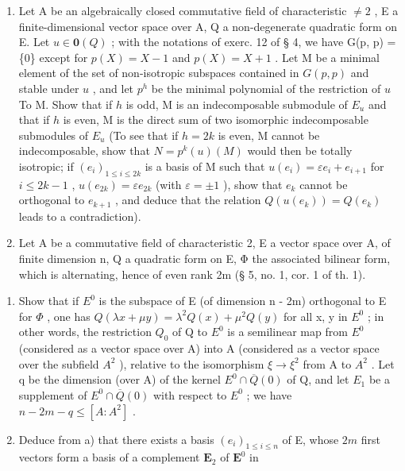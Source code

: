 \begin{enumerate}
\def\labelenumi{\arabic{enumi})}
\setcounter{enumi}{25}
\item
  Let A be an algebraically closed commutative field of characteristic \(\neq 2\) , E a finite-dimensional vector space over A, Q a non-degenerate quadratic form on E. Let \(u \in \mathbf{0}(Q)\) ; with the notations of exerc. 12 of § 4, we have G(p, p) = \{0\} except for \(p(X) = X - 1\) and \(p(X) = X + 1\) . Let M be a minimal element of the set of non-isotropic subspaces contained in \(G(p, p)\) and stable under \(u\) , and let \(p^h\) be the minimal polynomial of the restriction of \(u\) To M. Show that if \(h\) is odd, M is an indecomposable submodule of \(E_u\) and that if \(h\) is even, M is the direct sum of two isomorphic indecomposable submodules of \(E_u\) (To see that if \(h = 2k\) is even, M cannot be indecomposable, show that \(N = p^k(u)(M)\) would then be totally isotropic; if \((e_i)_{1 \leqslant i \leqslant 2k}\) is a basis of M such that \(u(e_i) = \varepsilon e_i + e_{i+1}\) for \(i \leqslant 2k - 1\) , \(u(e_{2k}) = \varepsilon e_{2k}\) (with \(\varepsilon = \pm 1\) ), show that \(e_k\) cannot be orthogonal to \(e_{k+1}\) , and deduce that the relation \(Q(u(e_k)) = Q(e_k)\) leads to a contradiction).
\item
  Let A be a commutative field of characteristic 2, E a vector space over A, of finite dimension n, Q a quadratic form on E, Φ the associated bilinear form, which is alternating, hence of even rank 2m (§ 5, no. 1, cor. 1 of th. 1).
\end{enumerate}

\begin{enumerate}
\def\labelenumi{\alph{enumi})}
\item
  Show that if \(E^{0}\) is the subspace of E (of dimension n - 2m) orthogonal to E for \(\Phi\) , one has \(Q(\lambda x + \mu y) = \lambda^{2}Q(x) + \mu^{2}Q(y)\) for all x, y in \(E^{0}\) ; in other words, the restriction \(Q_{0}\) of Q to \(E^{0}\) is a semilinear map from \(E^{0}\) (considered as a vector space over A) into A (considered as a vector space over the subfield \(A^{2}\) ), relative to the isomorphism \(\xi \to \xi^{2}\) from A to \(A^{2}\) . Let q be the dimension (over A) of the kernel \(E^{0} \cap \overline{Q}(0)\) of Q, and let \(E_{1}\) be a supplement of \(E^{0} \cap \overline{Q}(0)\) with respect to \(E^{0}\) ; we have \(n - 2m - q \leqslant [A : A^{2}]\) .
\item
  Deduce from a) that there exists a basis \((e_i)_{1 \leqslant i \leqslant n}\) of E, whose \(2m\) first vectors form a basis of a complement \(\mathbf{E}_2\) of \(\mathbf{E}^0\) in
\end{enumerate}

